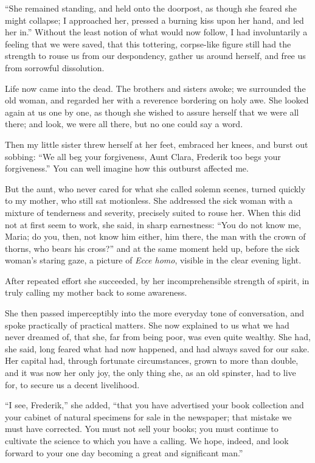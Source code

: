 \documentclass[12pt,a4paper]{book}
\begin{document}
``She remained standing, and held onto the doorpost, as though she feared she might collapse; I approached her, pressed a burning kiss upon her hand, and led her in.''
Without the least notion of what would now follow, I had involuntarily a feeling that we were saved, that this tottering, corpse-like figure still had the strength to rouse us from our despondency, gather us around herself, and free us from sorrowful dissolution.

Life now came into the dead. The brothers and sisters awoke; we surrounded the old woman, and regarded her with a reverence bordering on holy awe. She looked again at us one by one, as though she wished to assure herself that we were all there; and look, we were all there, but no one could say a word.

Then my little sister threw herself at her feet, embraced her knees, and burst out sobbing: ``We all beg your forgiveness, Aunt Clara, Frederik too begs your forgiveness.'' You can well imagine how this outburst affected me.

But the aunt, who never cared for what she called solemn scenes, turned quickly to my mother, who still sat motionless. She addressed the sick woman with a mixture of tenderness and severity, precisely suited to rouse her. When this did not at first seem to work, she said, in sharp earnestness: ``You do not know me, Maria; do you, then, not know him either, him there, the man with the crown of thorns, who bears his cross?'' and at the same moment held up, before the sick woman's staring gaze, a picture of \textit{Ecce homo}, visible in the clear evening light.

After repeated effort she succeeded, by her incomprehensible strength of spirit, in truly calling my mother back to some awareness.

She then passed imperceptibly into the more everyday tone of conversation, and spoke practically of practical matters. She now explained to us what we had never dreamed of, that she, far from being poor, was even quite wealthy. She had, she said, long feared what had now happened, and had always saved for our sake. Her capital had, through fortunate circumstances, grown to more than double, and it was now her only joy, the only thing she, as an old spinster, had to live for, to secure us a decent
livelihood.

``I see, Frederik,'' she added, ``that you have advertised your book collection and your cabinet of natural specimens for sale in the newspaper; that mistake we must have corrected. You must not sell your books; you must continue to cultivate the science to which you have a calling. We hope, indeed, and look forward to your one day becoming a great and significant man.''
\end{document}
